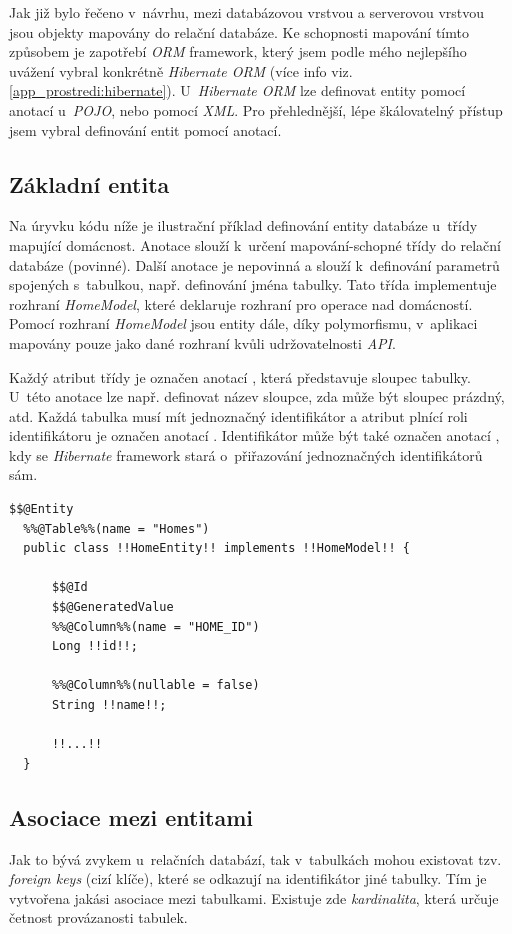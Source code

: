 Jak již bylo řečeno v~návrhu, mezi databázovou vrstvou a serverovou vrstvou jsou objekty mapovány do relační databáze.
Ke schopnosti mapování tímto způsobem je zapotřebí \emph{ORM} framework, který jsem podle mého nejlepšího uvážení vybral konkrétně \emph{Hibernate ORM} (více info viz. \ref{app_prostredi:hibernate}).
U~\emph{Hibernate ORM} lze definovat entity pomocí anotací u~\emph{POJO}, nebo pomocí \emph{XML}.
Pro přehlednější, lépe škálovatelný přístup jsem vybral definování entit pomocí anotací.

\subsection*{Základní entita}

Na úryvku kódu níže je ilustrační příklad definování entity databáze u~třídy mapující domácnost.
Anotace  slouží k~určení mapování-schopné třídy do relační databáze (povinné).
Další anotace  je nepovinná a slouží k~definování parametrů spojených s~tabulkou, např. definování jména tabulky.
Tato třída implementuje rozhraní \emph{HomeModel}, které deklaruje rozhraní pro operace nad domácností.
Pomocí rozhraní \emph{HomeModel} jsou entity dále, díky polymorfismu, v~aplikaci mapovány pouze jako dané rozhraní kvůli udržovatelnosti \emph{API}.

Každý atribut třídy je označen anotací , která představuje sloupec tabulky.
U~této anotace lze např. definovat název sloupce, zda může být sloupec prázdný, atd.
Každá tabulka musí mít jednoznačný identifikátor a atribut plnící roli identifikátoru je označen anotací .
Identifikátor může být také označen anotací , kdy se \emph{Hibernate} framework stará o~přiřazování jednoznačných identifikátorů sám.

\begin{lstlisting}[style=JavaStyle, caption={Ukázka definování entity}]
  $$@Entity
  %%@Table%%(name = "Homes")
  public class !!HomeEntity!! implements !!HomeModel!! {
  
      $$@Id
      $$@GeneratedValue
      %%@Column%%(name = "HOME_ID")
      Long !!id!!;
  
      %%@Column%%(nullable = false)
      String !!name!!;

      !!...!!
  }
\end{lstlisting}

\newpage
\subsection*{Asociace mezi entitami}
Jak to bývá zvykem u~relačních databází, tak v~tabulkách mohou existovat tzv. \emph{foreign keys} (cizí klíče), které se odkazují na identifikátor jiné tabulky.
Tím je vytvořena jakási asociace mezi tabulkami.
Existuje zde \emph{kardinalita}, která určuje četnost provázanosti tabulek.

